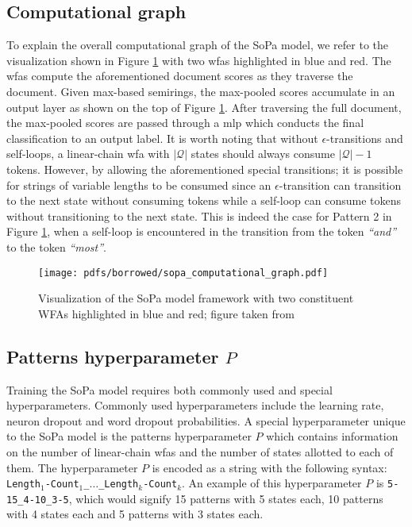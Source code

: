 \subsection{Computational graph}

\label{section:sopa_cg}

To explain the overall computational graph of the SoPa model, we refer to the
visualization shown in Figure \ref{fig:sopa} with two \ac{wfas} highlighted in
blue and red. The \ac{wfas} compute the aforementioned document scores as they
traverse the document. Given max-based semirings, the max-pooled scores
accumulate in an output layer as shown on the top of Figure \ref{fig:sopa}.
After traversing the full document, the max-pooled scores are passed through a
\ac{mlp} which conducts the final classification to an output label. It is worth
noting that without $\epsilon$-transitions and self-loops, a linear-chain
\ac{wfa} with $|\mathcal{Q}|$ states should always consume $\mathcal{|Q|}-1$
tokens. However, by allowing the aforementioned special transitions; it is
possible for strings of variable lengths to be consumed since an
$\epsilon$-transition can transition to the next state without consuming tokens
while a self-loop can consume tokens without transitioning to the next state.
This is indeed the case for Pattern 2 in Figure \ref{fig:sopa}, when a self-loop
is encountered in the transition from the token \textit{``and''} to the token
\textit{``most''}.

\begin{figure}[t]
  \centering
  \texttt{[image: pdfs/borrowed/sopa\_computational\_graph.pdf]}
  \caption{Visualization of the SoPa model framework with two constituent
    WFAs highlighted in blue and red; figure taken from
    \citet{schwartz2018sopa}}
  \label{fig:sopa}
\end{figure}

\subsection{Patterns hyperparameter $P$}

Training the SoPa model requires both commonly used and special hyperparameters.
Commonly used hyperparameters include the learning rate, neuron dropout and word
dropout probabilities. A special hyperparameter unique to the SoPa model is the
patterns hyperparameter $P$ which contains information on the number of
linear-chain \ac{wfas} and the number of states allotted to each of them. The
hyperparameter $P$ is encoded as a string with the following syntax:
\texttt{Length$_{1}$-Count$_{1}$\_$\dots$\_Length$_{k}$-Count$_{k}$}. An example
of this hyperparameter $P$ is \texttt{5-15\_4-10\_3-5}, which would signify 15
patterns with 5 states each, 10 patterns with 4 states each and 5 patterns with
3 states each.

